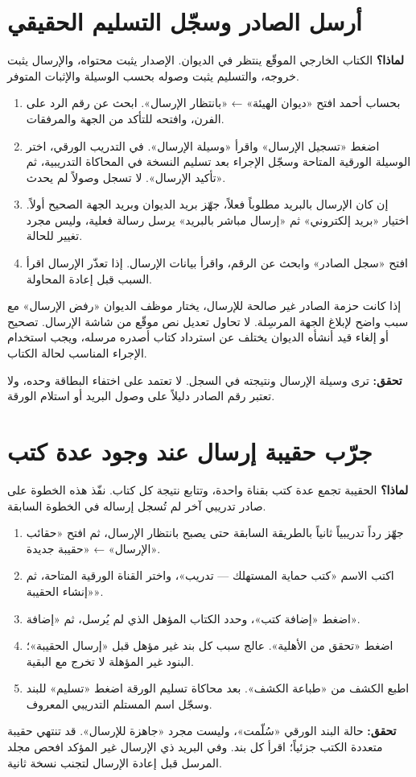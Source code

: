 \section{أرسل الصادر وسجّل التسليم الحقيقي}
\label{sec:dispatch}
\textbf{لماذا؟} الكتاب الخارجي الموقّع ينتظر في الديوان. الإصدار يثبت محتواه، والإرسال يثبت خروجه، والتسليم يثبت وصوله بحسب الوسيلة والإثبات المتوفر.
\begin{enumerate}
\item بحساب أحمد افتح «ديوان الهيئة» ← «بانتظار الإرسال». ابحث عن رقم الرد على الفرن، وافتحه للتأكد من الجهة والمرفقات.
\item اضغط «تسجيل الإرسال» واقرأ «وسيلة الإرسال». في التدريب الورقي، اختر الوسيلة الورقية المتاحة وسجّل الإجراء بعد تسليم النسخة في المحاكاة التدريبية، ثم «تأكيد الإرسال». لا تسجل وصولاً لم يحدث.
\item إن كان الإرسال بالبريد مطلوباً فعلاً، جهّز بريد الديوان وبريد الجهة الصحيح أولاً. اختيار «بريد إلكتروني» ثم «إرسال مباشر بالبريد» يرسل رسالة فعلية، وليس مجرد تغيير للحالة.
\item افتح «سجل الصادر» وابحث عن الرقم، واقرأ بيانات الإرسال. إذا تعذّر الإرسال اقرأ السبب قبل إعادة المحاولة.
\end{enumerate}
\begin{rcnote}
إذا كانت حزمة الصادر غير صالحة للإرسال، يختار موظف الديوان «رفض الإرسال» مع سبب واضح لإبلاغ الجهة المرسِلة. لا تحاول تعديل نص موقّع من شاشة الإرسال. تصحيح أو إلغاء قيد أنشأه الديوان يختلف عن استرداد كتاب أصدره مرسله، ويجب استخدام الإجراء المناسب لحالة الكتاب.
\end{rcnote}
\textbf{تحقق:} ترى وسيلة الإرسال ونتيجته في السجل. لا تعتمد على اختفاء البطاقة وحده، ولا تعتبر رقم الصادر دليلاً على وصول البريد أو استلام الورقة.

\section{جرّب حقيبة إرسال عند وجود عدة كتب}
\label{sec:batch}
\textbf{لماذا؟} الحقيبة تجمع عدة كتب بقناة واحدة، وتتابع نتيجة كل كتاب. نفّذ هذه الخطوة على صادر تدريبي آخر لم تُسجل إرساله في الخطوة السابقة.
\begin{enumerate}
\item جهّز رداً تدريبياً ثانياً بالطريقة السابقة حتى يصبح بانتظار الإرسال، ثم افتح «حقائب الإرسال» ← «حقيبة جديدة».
\item اكتب الاسم «كتب حماية المستهلك — تدريب»، واختر القناة الورقية المتاحة، ثم «إنشاء الحقيبة».
\item اضغط «إضافة كتب»، وحدد الكتاب المؤهل الذي لم يُرسل، ثم «إضافة».
\item اضغط «تحقق من الأهلية». عالج سبب كل بند غير مؤهل قبل «إرسال الحقيبة»؛ البنود غير المؤهلة لا تخرج مع البقية.
\item اطبع الكشف من «طباعة الكشف». بعد محاكاة تسليم الورقة اضغط «تسليم» للبند وسجّل اسم المستلم التدريبي المعروف.
\end{enumerate}
\textbf{تحقق:} حالة البند الورقي «سُلّمت»، وليست مجرد «جاهزة للإرسال». قد تنتهي حقيبة متعددة الكتب جزئياً؛ اقرأ كل بند. وفي البريد ذي الإرسال غير المؤكد افحص مجلد المرسل قبل إعادة الإرسال لتجنب نسخة ثانية.

